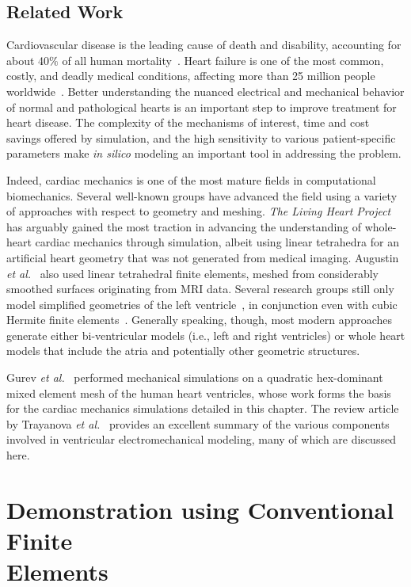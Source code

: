 \subsection{Related Work}
Cardiovascular disease is the leading cause of death and disability, accounting for about 40$\%$ of all human mortality~\cite{genet_2015}. Heart failure is one of the most common, costly, and deadly medical conditions, affecting more than 25 million people worldwide~\cite{mann_2015}. Better understanding the nuanced electrical and mechanical behavior of normal and pathological hearts is an important step to improve treatment for heart disease. The complexity of the mechanisms of interest, time and cost savings offered by simulation, and the high sensitivity to various patient-specific parameters make \textit{in silico} modeling an important tool in addressing the problem.

Indeed, cardiac mechanics is one of the most mature fields in computational biomechanics. Several well-known groups have advanced the field using a variety of approaches with respect to geometry and meshing. \textit{The Living Heart Project}~\cite{genet_2015, baillargeon_2014} has arguably gained the most traction in advancing the understanding of whole-heart cardiac mechanics through simulation, albeit using linear tetrahedra for an artificial heart geometry that was not generated from medical imaging. Augustin \textit{et al.}~\cite{augustin_2016} also used linear tetrahedral finite elements, meshed from considerably smoothed surfaces originating from MRI data. Several research groups still only model simplified geometries of the left ventricle~\cite{guccione_2005, sack_2016}, in conjunction even with cubic Hermite finite elements~\cite{mcculloch_2000}. Generally speaking, though, most modern approaches generate either bi-ventricular models (i.e., left and right ventricles) or whole heart models that include the atria and potentially other geometric structures.

Gurev \textit{et al.}~\cite{gurev_2015} performed mechanical simulations on a quadratic hex-dominant mixed element mesh of the human heart ventricles, whose work forms the basis for the cardiac mechanics simulations detailed in this chapter. The review article by Trayanova \textit{et al.}~\cite{trayanova_2011} provides an excellent summary of the various components involved in ventricular electromechanical modeling, many of which are discussed here.

\section[Demonstration using Conventional Finite Elements]{Demonstration using Conventional Finite \\ Elements}

